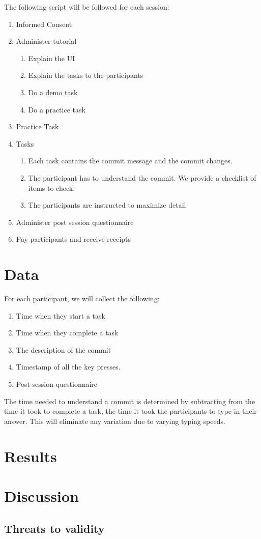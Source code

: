 \documentclass[letterpaper]{article}
\begin{document}
The following script will be followed for each session:
\begin{enumerate}
	\item Informed Consent
	\item Administer tutorial
	\begin{enumerate}
		\item Explain the UI
		\item Explain the tasks to the participants
		\item Do a demo task
		\item Do a practice task
	\end{enumerate}
	\item Practice Task
	\item Tasks
	\begin{enumerate}
		\item Each task contains the commit message and the commit changes.
		\item The participant has to understand the commit. We provide a checklist of items to check.
		\item The participants are instructed to maximize detail
	\end{enumerate}
	\item Administer post session questionnaire
	\item Pay participants and receive receipts 
\end{enumerate}

\section{Data}

For each participant, we will collect the following:
\begin{enumerate}
	\item Time when they start a task
	\item Time when they complete a task
	\item The description of the commit
	\item Timestamp of all the key presses.
	\item Post-session questionnaire
\end{enumerate}

The time needed to understand a commit is determined by subtracting from the time it took to complete a task, the time it took the participants to type in their answer.
This will eliminate any variation due to varying typing speeds.

\section{Results}

\section{Discussion}

\subsection{Threats to validity}
\end{document}
